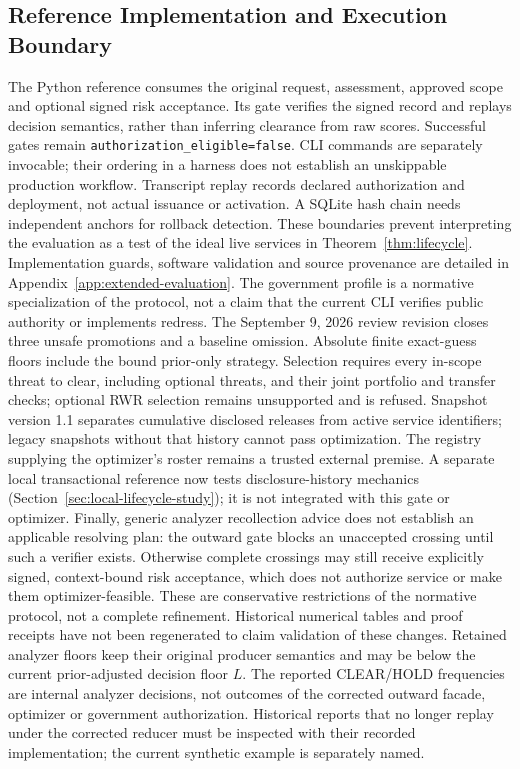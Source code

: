\documentclass[conference,compsoc]{IEEEtran}
\newcommand{\code}[1]{\texttt{\small #1}}
\begin{document}
\subsection{Reference Implementation and Execution Boundary}
\label{sec:implementation}
The Python reference consumes the original request, assessment, approved
scope and optional signed risk acceptance. Its gate verifies the signed
record and replays decision semantics, rather than inferring clearance from
raw scores. Successful gates remain
\code{authorization\_eligible=false}. CLI commands are separately invocable;
their ordering in a harness does not establish an unskippable production
workflow. Transcript replay records declared authorization and deployment,
not actual issuance or activation. A SQLite hash chain needs independent
anchors for rollback detection. These boundaries prevent interpreting the
evaluation as a test of the ideal live services in
Theorem~\ref{thm:lifecycle}. Implementation guards, software validation and
source provenance are detailed in Appendix~\ref{app:extended-evaluation}.
The government profile is a normative specialization of the protocol, not a
claim that the current CLI verifies public authority or implements redress.
The September 9, 2026 review revision closes three unsafe promotions and a
baseline omission. Absolute finite exact-guess floors include the bound
prior-only strategy. Selection requires every in-scope threat to clear,
including optional threats, and their joint portfolio and transfer checks;
optional RWR selection remains unsupported and is refused. Snapshot version
1.1 separates cumulative disclosed releases from active service identifiers;
legacy snapshots without that history cannot pass optimization. The registry
supplying the optimizer's roster remains a trusted external premise. A separate
local transactional reference now tests disclosure-history mechanics
(Section~\ref{sec:local-lifecycle-study}); it is not integrated with this gate
or optimizer. Finally, generic analyzer recollection advice
does not establish an applicable resolving plan: the outward gate blocks an
unaccepted crossing until such a verifier exists. Otherwise complete crossings
may still receive explicitly signed, context-bound risk acceptance, which
does not authorize service or make them optimizer-feasible. These are
conservative restrictions of the normative protocol, not a complete refinement.
Historical numerical tables and proof receipts have not been regenerated to
claim validation of these changes.
Retained analyzer floors keep their original producer semantics and may be
below the current prior-adjusted decision floor $L$. The reported CLEAR/HOLD
frequencies are internal analyzer decisions, not outcomes of the corrected
outward facade, optimizer or government authorization. Historical reports that
no longer replay under the corrected reducer must be inspected with their
recorded implementation; the current synthetic example is separately named.
\end{document}
